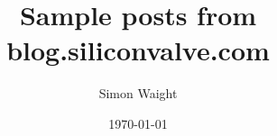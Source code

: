 \usepackage[utf8]{inputenc}
\usepackage[T1]{fontenc}
\usepackage{geometry}
\geometry{a4paper}

\title{Sample posts from blog.siliconvalve.com}
\author{Simon Waight}
\date{\today}

\usepackage{float}
\let\origfigure\figure
\let\endorigfigure\endfigure
\renewenvironment{figure}[1][2] {
    \expandafter\origfigure\expandafter[H]
} {
    \endorigfigure
}